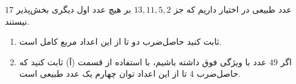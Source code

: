 \EXERCISE
$17$
عدد طبیعی در اختیار داریم که جز 
$13, 11, 5, 2$
بر هیچ عدد اول دیگری بخش‌پذیر نیستند.
\begin{enumerate}
\item
ثابت کنید حاصل‌ضرب دو تا از این اعداد مربع کامل است.
\item
اگر
$49$
عدد با ویژگی فوق داشته باشیم، با استفاده از قسمت (آ) ثابت کنید که حاصل‌ضرب
$4$
تا از این اعداد توان چهارم یک عدد طبیعی است.
\end{enumerate}